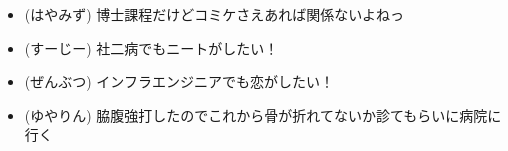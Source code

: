 
%
%

\begin{itemize}
 \item (はやみず) 博士課程だけどコミケさえあれば関係ないよねっ
 \item (すーじー) 社二病でもニートがしたい！
 \item (ぜんぶつ) インフラエンジニアでも恋がしたい！
 \item (ゆやりん) 脇腹強打したのでこれから骨が折れてないか診てもらいに病院に行く
\end{itemize}
